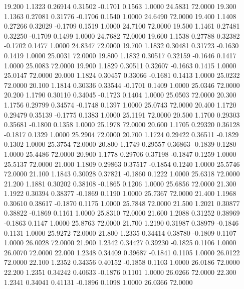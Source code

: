  19.200   1.1323   0.26914   0.31502  -0.1701   0.1563   1.0000  24.5831  72.0000
  19.300   1.1363   0.27081   0.31776  -0.1706   0.1540   1.0000  24.6490  72.0000
  19.400   1.1408   0.27266   0.32029  -0.1709   0.1519   1.0000  24.7100  72.0000
  19.500   1.1461   0.27481   0.32250  -0.1709   0.1499   1.0000  24.7682  72.0000
  19.600   1.1538   0.27788   0.32382  -0.1702   0.1477   1.0000  24.8347  72.0000
  19.700   1.1832   0.30481   0.31723  -0.1630   0.1419   1.0000  25.0031  72.0000
  19.800   1.1832   0.30517   0.32159  -0.1646   0.1417   1.0000  25.0083  72.0000
  19.900   1.1829   0.30511   0.32607  -0.1663   0.1415   1.0000  25.0147  72.0000
  20.000   1.1824   0.30457   0.33066  -0.1681   0.1413   1.0000  25.0232  72.0000
  20.100   1.1814   0.30336   0.33544  -0.1701   0.1409   1.0000  25.0346  72.0000
  20.200   1.1790   0.30110   0.34045  -0.1723   0.1404   1.0000  25.0503  72.0000
  20.300   1.1756   0.29799   0.34574  -0.1748   0.1397   1.0000  25.0743  72.0000
  20.400   1.1720   0.29479   0.35139  -0.1775   0.1383   1.0000  25.1191  72.0000
  20.500   1.1700   0.29303   0.35681  -0.1800   0.1358   1.0000  25.1978  72.0000
  20.600   1.1705   0.29320   0.36128  -0.1817   0.1329   1.0000  25.2904  72.0000
  20.700   1.1724   0.29422   0.36511  -0.1829   0.1302   1.0000  25.3754  72.0000
  20.800   1.1749   0.29557   0.36863  -0.1839   0.1280   1.0000  25.4486  72.0000
  20.900   1.1778   0.29706   0.37198  -0.1847   0.1259   1.0000  25.5137  72.0000
  21.000   1.1809   0.29863   0.37517  -0.1854   0.1240   1.0000  25.5746  72.0000
  21.100   1.1843   0.30028   0.37821  -0.1860   0.1222   1.0000  25.6318  72.0000
  21.200   1.1881   0.30202   0.38108  -0.1865   0.1206   1.0000  25.6856  72.0000
  21.300   1.1922   0.30394   0.38377  -0.1869   0.1190   1.0000  25.7367  72.0000
  21.400   1.1968   0.30610   0.38617  -0.1870   0.1175   1.0000  25.7848  72.0000
  21.500   1.2021   0.30877   0.38822  -0.1869   0.1161   1.0000  25.8310  72.0000
  21.600   1.2088   0.31252   0.38969  -0.1863   0.1147   1.0000  25.8763  72.0000
  21.700   1.2190   0.31987   0.38979  -0.1846   0.1131   1.0000  25.9272  72.0000
  21.800   1.2335   0.34414   0.38780  -0.1809   0.1107   1.0000  26.0028  72.0000
  21.900   1.2342   0.34427   0.39230  -0.1825   0.1106   1.0000  26.0070  72.0000
  22.000   1.2348   0.34409   0.39687  -0.1841   0.1105   1.0000  26.0122  72.0000
  22.100   1.2352   0.34356   0.40152  -0.1858   0.1103   1.0000  26.0186  72.0000
  22.200   1.2351   0.34242   0.40633  -0.1876   0.1101   1.0000  26.0266  72.0000
  22.300   1.2341   0.34041   0.41131  -0.1896   0.1098   1.0000  26.0366  72.0000
